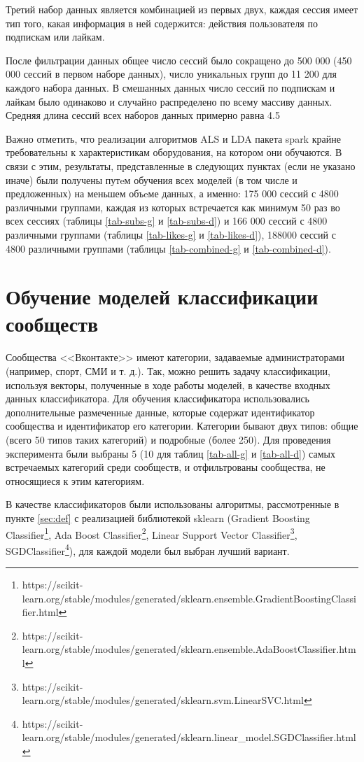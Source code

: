 \documentclass[times,specification,annotation]{itmo-student-thesis}
\begin{document}
Третий набор данных является комбинацией из первых двух, каждая сессия имеет тип того, какая информация в ней содержится: действия пользователя по подпискам или лайкам. 

После фильтрации данных общее число сессий было сокращено до 500 000 (450 000 сессий в первом наборе данных), число уникальных групп до 11 200 для каждого набора данных. В смешанных данных число сессий по подпискам и лайкам было одинаково и случайно распределено по всему массиву данных. Средняя длина сессий всех наборов данных примерно равна 4.5

Важно отметить, что реализации алгоритмов ALS и LDA пакета spark крайне требовательны к характеристикам оборудования, на котором они обучаются. В связи с этим, результаты, представленные в следующих пунктах (если не указано иначе) были получены путeм обучения всех моделей (в том числе и предложенных) на меньшем объeме данных, а именно: 175 000 сессий с 4800 различными группами, каждая из которых встречается как минимум 50 раз во всех сессиях (таблицы  \ref{tab-subs-g} и \ref{tab-subs-d}) и 166 000 сессий с 4800 различными группами (таблицы \ref{tab-likes-g} и \ref{tab-likes-d}), 188000 сессий с 4800 различными группами (таблицы \ref{tab-combined-g} и \ref{tab-combined-d}). 

\section{Обучение моделей классификации сообществ}\label{sec:class}

Сообщества <<Вконтакте>> имеют категории, задаваемые администраторами
(например, спорт, СМИ и т. д.). Так, можно решить задачу классификации,
используя векторы, полученные в ходе работы моделей, в качестве входных
данных классификатора.  Для обучения классификатора использовались дополнительные размеченные данные, которые содержат идентификатор сообщества и идентификатор его категории. Категории бывают двух типов: общие (всего 50 типов таких категорий) и подробные (более 250). Для проведения эксперимента были выбраны 5 (10 для таблиц  \ref{tab-all-g} и  \ref{tab-all-d}) самых встречаемых категорий среди сообществ, и отфильтрованы сообщества, не относящиеся к этим категориям.

В качестве классификаторов были использованы алгоритмы, рассмотренные в пункте \ref{sec:def} с реализацией библиотекой sklearn (Gradient Boosting Classifier\footnote{https://scikit-learn.org/stable/modules/generated/sklearn.ensemble.GradientBoostingClassifier.html}, Ada Boost Classifier\footnote{https://scikit-learn.org/stable/modules/generated/sklearn.ensemble.AdaBoostClassifier.html}, Linear Support Vector Classifier\footnote{https://scikit-learn.org/stable/modules/generated/sklearn.svm.LinearSVC.html}, SGDClassifier\footnote{https://scikit-learn.org/stable/modules/generated/sklearn.linear\_model.SGDClassifier.html}), для каждой модели был выбран лучший вариант. 
\end{document}
